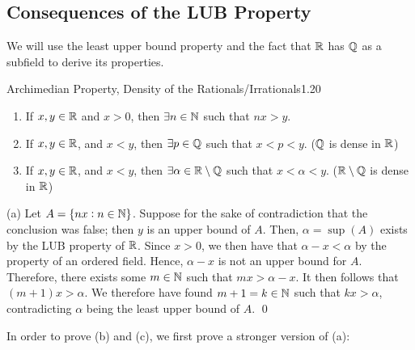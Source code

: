 \subsection{Consequences of the LUB Property}
We will use the least upper bound property and the fact that $\mathbb{R}$ has $\mathbb{Q}$ as a subfield to derive its properties.
\begin{theorem}{Archimedian Property, Density of the Rationals/Irrationals}{1.20}
    \begin{enumerate}
        \item If $x, y \in \mathbb{R}$ and $x > 0$, then $\exists n \in \mathbb{N}$ such that $nx > y$.
        \item If $x, y \in \mathbb{R}$, and $x < y$, then $\exists p \in \mathbb{Q}$ such that $x < p < y$. ($\mathbb{Q}$ is dense in $\mathbb{R}$)
        \item If $x, y \in \mathbb{R}$, and $x < y$, then $\exists \alpha \in \mathbb{R} \setminus \mathbb{Q}$ such that $x < \alpha < y$. ($\mathbb{R}\setminus\mathbb{Q}$ is dense in $\mathbb{R}$)
    \end{enumerate}
\end{theorem}

\begin{nproof}
    (a) Let $A = \set{nx: n \in \mathbb{N}}$. Suppose for the sake of contradiction that the conclusion was false; then $y$ is an upper bound of $A$. Then, $\alpha = \sup(A)$ exists by the LUB property of $\mathbb{R}$. Since $x > 0$, we then have that $\alpha - x < \alpha$ by the property of an ordered field. Hence, $\alpha - x$ is not an upper bound for $A$. Therefore, there exists some $m \in \mathbb{N}$ such that $mx > \alpha - x$. It then follows that $(m+1)x > \alpha$. We therefore have found $m+1 = k \in \mathbb{N}$ such that $kx > \alpha$, contradicting $\alpha$ being the least upper bound of $A$. \qed
\end{nproof}

\noindent In order to prove (b) and (c), we first prove a stronger version of (a):

